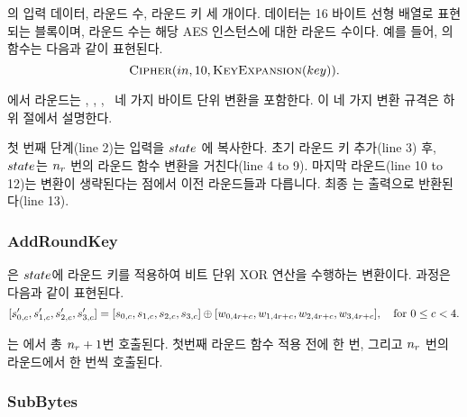\documentclass{article}
\begin{document}
\cipher 의 입력 데이터, 라운드 수, 라운드 키 세 개이다. 데이터는 16 바이트 선형
배열로 표현되는 블록이며, 라운드 수는 해당 AES 인스턴스에 대한 라운드 수이다.
예를 들어, 의 \cipher 함수는 다음과 같이 표현된다.
$$
    \textsc{Cipher}(in, 10, \textsc{KeyExpansion}(key)).
$$

\cipher 에서 라운드는 \sb, \sr, \mc, \ar \ 네 가지 바이트 단위 변환을 포함한다.
이 네 가지 변환 규격은 하위 절에서 설명한다.

첫 번째 단계(line 2)는 입력을 $state$ 에 복사한다. 초기 라운드 키 추가(line 3)
후, $state$는 $n_r$ 번의 라운드 함수 변환을 거친다(line 4 to 9). 마지막
라운드(line 10 to 12)는 \mc 변환이 생략된다는 점에서 이전 라운드들과 다릅니다.
최종 \state 는 출력으로 반환된다(line 13).


\subsubsection{AddRoundKey}



\ar 은 $state$에 라운드 키를 적용하여 비트 단위 XOR 연산을 수행하는 변환이다. 
과정은 다음과 같이 표현된다.
$$
    [s'_{0, c}, s'_{1, c}, s'_{2, c}, s'_{3, c}]
     = [s_{0, c}, s_{1, c}, s_{2, c}, s_{3, c}]
     \oplus [w_{0, 4r + c}, w_{1, 4r + c} , w_{2, 4r + c}, w_{3, 4r + c}],
     \quad \text{for } 0 \le c < 4.
$$

\ar 는 \cipher 에서 총 $n_r + 1$번 호출된다. 첫번째 라운드 함수 적용 전에 한 번,
그리고 $n_r$ 번의 라운드에서 한 번씩 호출된다.


\subsubsection{SubBytes}



\end{document}
